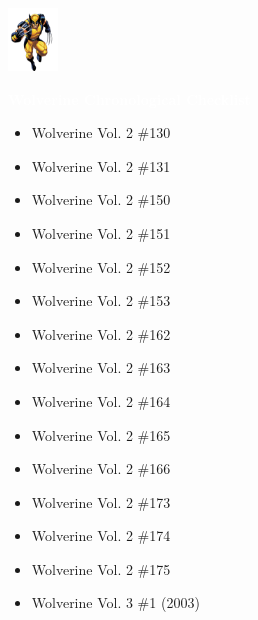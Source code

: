 \documentclass[12pt]{article}
\newcommand{\checkbox}{\raisebox{0.0ex}{\fbox{\rule{0ex}{1.5ex} \rule{1.5ex}{0ex}}}}
\begin{document}
\newpage
{}
\begin{center}
    \vspace*{2cm}
    \includegraphics[width=0.1\textwidth]{wolverine.png}
    \vspace{0.3cm}

    {\Huge \textbf{\textcolor{white}{Wolverine Chronological Checklist}}}
\end{center}
\vspace{0.3cm}
\noindent
\begin{tcolorbox}[
  colback=white!95!gray, colframe=black,
  width=\textwidth, arc=4mm, auto outer arc,
  boxrule=0.8pt,
  left=8pt,right=8pt,top=8pt,bottom=8pt
]
\begin{itemize}[left=0pt,label={\checkbox}]
  \item Wolverine Vol. 2 \#130
  \item Wolverine Vol. 2 \#131
  \item Wolverine Vol. 2 \#150
  \item Wolverine Vol. 2 \#151
  \item Wolverine Vol. 2 \#152
  \item Wolverine Vol. 2 \#153
  \item Wolverine Vol. 2 \#162
  \item Wolverine Vol. 2 \#163
  \item Wolverine Vol. 2 \#164
  \item Wolverine Vol. 2 \#165
  \item Wolverine Vol. 2 \#166
  \item Wolverine Vol. 2 \#173
  \item Wolverine Vol. 2 \#174
  \item Wolverine Vol. 2 \#175
  \item Wolverine Vol. 3 \#1 (2003)
\end{itemize}
\end{tcolorbox}
\end{document}
